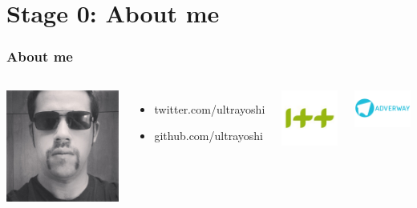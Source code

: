 \section{Stage 0: About me}

\begin{frame}
  \frametitle{About me}
  \begin{columns}[c]
    \column{1.75in}
    \includegraphics[width=150px]{images/bastard_david.jpg}
    \begin{itemize}
      \item twitter.com/ultrayoshi
      \item github.com/ultrayoshi
    \end{itemize}
    \column{1.25in}
    \begin{center}
      \includegraphics[width=75px]{images/imesmes-logo.png}
    \end{center}
    \begin{center}
      \includegraphics[width=75px]{images/adverway-logo.png}
    \end{center}
  \end{columns}
\end{frame}
